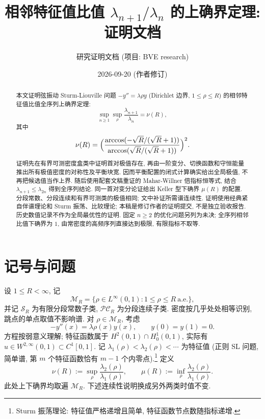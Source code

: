 \documentclass[UTF8]{ctexart}
\title{相邻特征值比值 \texorpdfstring{$\lambda_{n+1}/\lambda_n$}{lambda_{n+1}/lambda_n} 的上确界定理: 证明文档}
\author{研究证明文档 (项目: BVE research)}
\date{2026-09-20 (作者修订)}
\begin{document}
\maketitle

\begin{abstract}
本文证明弦振动 Sturm-Liouville 问题 $-y'' = \lambda\rho y$ (Dirichlet 边界,
$1 \leq \rho \leq R$) 的相邻特征值比值全序列上确界定理:
\[
	\sup_{n\geq 1}\sup_{\rho} \frac{\lambda_{n+1}}{\lambda_n} = \nu(R),
\]
其中
\[
	\nu(R) = \Bigl( \frac{\arccos(-\sqrt{R}/(\sqrt{R}+1))}{\arccos(\sqrt{R}/(\sqrt{R}+1))} \Bigr)^2 .
\]
证明先在有界可测密度盒类中证明首对极值存在, 再由一阶变分、切换函数和守恒能量
推出所有极值密度的对称性及平衡块宽. 因而平衡配置的闭式计算确实给出全局极值,
不再把候选值当作上界. 随后使用配套文稿重证的 Mahar-Willner 倍指标恒等式,
结合 $\lambda_{n+1}\leq\lambda_{2n}$ 得到全序列结论.
同一首对变分论证给出 Keller 型下确界 $\mu(R)$ 的配置.
分段常数、分段连续和有界可测类的极值相同; 文中补证所需谱连续性.
证明使用经典紧自伴谱理论和 Sturm 振荡、比较理论; 本稿是修订作者的证明提交,
不是独立验收报告. 历史数值记录不作为全局最优性的证明.
固定 $n\ge2$ 的优化问题另列为未决; 全序列相邻比值下确界为 $1$,
由常密度的高频序列直接达到极限, 有限指标不取等.
\end{abstract}

\tableofcontents

\section{记号与问题}

设 $1\leq R<\infty$, 记
\[
 \mathcal M_R=\{\rho\in L^\infty(0,1):1\leq\rho\leq R\ \text{a.e.}\},
\]
并记 $\mathcal S_R$ 为有限分段常数子类, $\mathcal{PC}_R$ 为分段连续子类.
密度按几乎处处相等识别, 跳点的单点取值不影响谱. 对 $\rho\in\mathcal M_R$, 考虑
\begin{equation}
	-y''(x) = \lambda \rho(x) y(x), \qquad y(0) = y(1) = 0 .
\end{equation}
方程按弱意义理解; 特征函数属于 $H^2(0,1)\cap H^1_0(0,1)$,
实际有 $u\in W^{2,\infty}(0,1)\subset C^1[0,1]$.
记 $\lambda_1(\rho) < \lambda_2(\rho) < \cdots$ 为特征值
(正则 SL 问题, 简单谱, 第 $m$ 个特征函数恰有 $m-1$ 个内零点).\footnote{Sturm 振荡理论: 特征值严格递增且简单, 特征函数节点数随指标递增.}
定义
\begin{equation}
	\nu(R) := \sup_{\rho} \frac{\lambda_2(\rho)}{\lambda_1(\rho)},
	\qquad
	\mu(R) := \inf_{\rho} \frac{\lambda_2(\rho)}{\lambda_1(\rho)} .
\end{equation}
此处上下确界均取遍 $\mathcal M_R$. 下述连续性说明换成另外两类时值不变.
\end{document}
